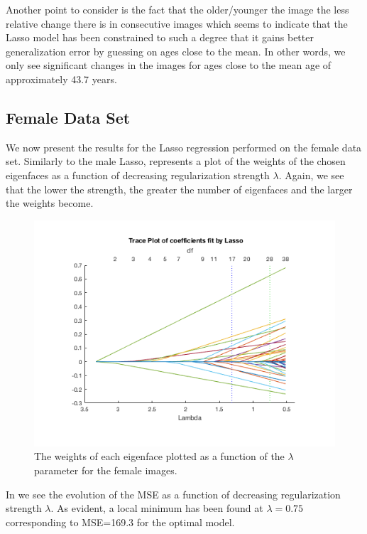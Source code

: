 Another point to consider is the fact that the older/younger the image the less relative change there is in consecutive images which seems to indicate that the Lasso model has been constrained to such a degree that it gains better generalization error by guessing on ages close to the mean. In other words, we only see significant changes in the images for ages close to the mean age of approximately 43.7 years.

\subsection{Female Data Set}

We now present the results for the Lasso regression performed on the female data set. Similarly to the male Lasso,  represents a plot of the weights of the chosen eigenfaces  as a function of decreasing regularization strength $\lambda$. Again, we see that the lower the strength, the greater the number of eigenfaces and the larger the weights become.

\begin{figure}[ht!]
    \centering
    \includegraphics[width=0.85\linewidth]{fig/Trace_F_40.png}
    \caption{The weights of each eigenface plotted as a function of the $\lambda$ parameter for the female images.}
    \label{fig:F_Trace}
\end{figure}

In  we see the evolution of the MSE as a function of decreasing regularization strength $\lambda$. As evident, a local minimum has been found at $\lambda = 0.75$ corresponding to MSE=169.3 for the optimal model. 

